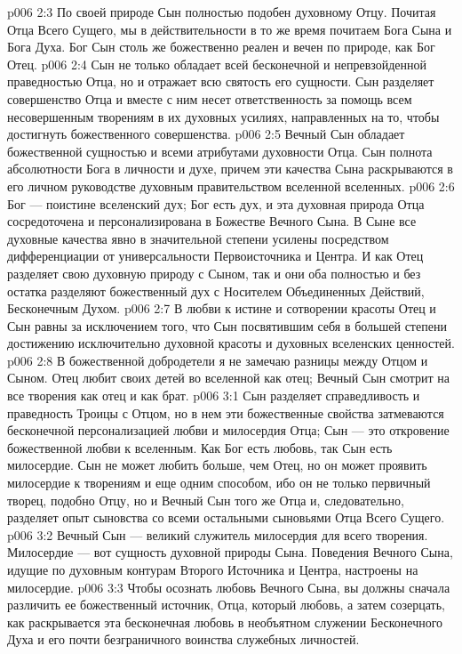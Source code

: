 \vs p006 2:3 По своей природе Сын полностью подобен духовному Отцу. Почитая Отца Всего Сущего, мы в действительности в то же время почитаем Бога Сына и Бога Духа. Бог Сын столь же божественно реален и вечен по природе, как Бог Отец.
\vs p006 2:4 Сын не только обладает всей бесконечной и непревзойденной праведностью Отца, но и отражает всю святость его сущности. Сын разделяет совершенство Отца и вместе с ним несет ответственность за помощь всем несовершенным творениям в их духовных усилиях, направленных на то, чтобы достигнуть божественного совершенства.
\vs p006 2:5 Вечный Сын обладает божественной сущностью и всеми атрибутами духовности Отца. Сын  полнота абсолютности Бога в личности и духе, причем эти качества Сына раскрываются в его личном руководстве духовным правительством вселенной вселенных.
\vs p006 2:6 Бог --- поистине вселенский дух; Бог есть дух, и эта духовная природа Отца сосредоточена и персонализирована в Божестве Вечного Сына. В Сыне все духовные качества явно в значительной степени усилены посредством дифференциации от универсальности Первоисточника и Центра. И как Отец разделяет свою духовную природу с Сыном, так и они оба полностью и без остатка разделяют божественный дух с Носителем Объединенных Действий, Бесконечным Духом.
\vs p006 2:7 В любви к истине и сотворении красоты Отец и Сын равны за исключением того, что Сын  посвятившим себя в большей степени достижению исключительно духовной красоты и духовных вселенских ценностей.
\vs p006 2:8 В божественной добродетели я не замечаю разницы между Отцом и Сыном. Отец любит своих детей во вселенной как отец; Вечный Сын смотрит на все творения как отец и как брат.
\vs p006 3:1 Сын разделяет справедливость и праведность Троицы с Отцом, но в нем эти божественные свойства затмеваются бесконечной персонализацией любви и милосердия Отца; Сын --- это откровение божественной любви к вселенным. Как Бог есть любовь, так Сын есть милосердие. Сын не может любить больше, чем Отец, но он может проявить милосердие к творениям и еще одним способом, ибо он не только первичный творец, подобно Отцу, но и Вечный Сын того же Отца и, следовательно, разделяет опыт сыновства со всеми остальными сыновьями Отца Всего Сущего.
\vs p006 3:2 Вечный Сын --- великий служитель милосердия для всего творения. Милосердие --- вот сущность духовной природы Сына. Поведения Вечного Сына, идущие по духовным контурам Второго Источника и Центра, настроены на милосердие.
\vs p006 3:3 Чтобы осознать любовь Вечного Сына, вы должны сначала различить ее божественный источник, Отца, который  любовь, а затем созерцать, как раскрывается эта бесконечная любовь в необъятном служении Бесконечного Духа и его почти безграничного воинства служебных личностей.
